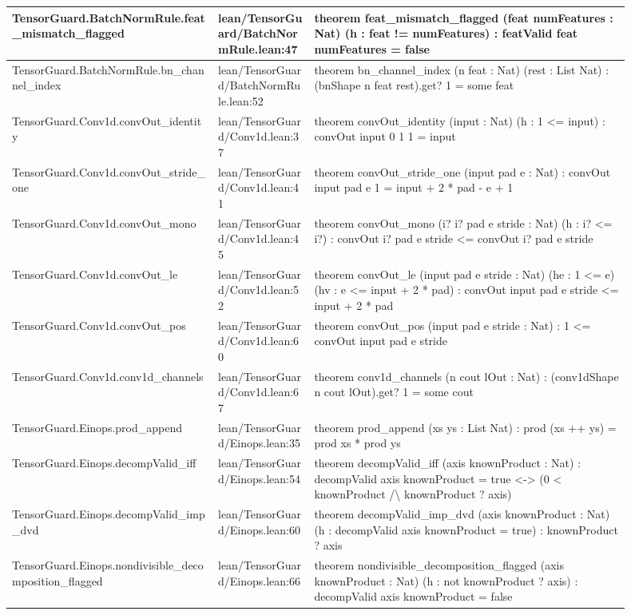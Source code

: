 \documentclass[10pt]{article}
\begin{document}
\begin{longtable}{|p{0.30\linewidth}|p{0.14\linewidth}|p{0.46\linewidth}|}
\hline
TensorGuard.BatchNormRule.feat\_mismatch\_flagged & lean/TensorGuard/BatchNormRule.lean:47 & theorem feat\_mismatch\_flagged (feat numFeatures : Nat) (h : feat != numFeatures) : featValid feat numFeatures = false \\
\hline
TensorGuard.BatchNormRule.bn\_channel\_index & lean/TensorGuard/BatchNormRule.lean:52 & theorem bn\_channel\_index (n feat : Nat) (rest : List Nat) : (bnShape n feat rest).get? 1 = some feat \\
\hline
TensorGuard.Conv1d.convOut\_identity & lean/TensorGuard/Conv1d.lean:37 & theorem convOut\_identity (input : Nat) (h : 1 <= input) : convOut input 0 1 1 = input \\
\hline
TensorGuard.Conv1d.convOut\_stride\_one & lean/TensorGuard/Conv1d.lean:41 & theorem convOut\_stride\_one (input pad e : Nat) : convOut input pad e 1 = input + 2 * pad - e + 1 \\
\hline
TensorGuard.Conv1d.convOut\_mono & lean/TensorGuard/Conv1d.lean:45 & theorem convOut\_mono (i? i? pad e stride : Nat) (h : i? <= i?) : convOut i? pad e stride <= convOut i? pad e stride \\
\hline
TensorGuard.Conv1d.convOut\_le & lean/TensorGuard/Conv1d.lean:52 & theorem convOut\_le (input pad e stride : Nat) (he : 1 <= e) (hv : e <= input + 2 * pad) : convOut input pad e stride <= input + 2 * pad \\
\hline
TensorGuard.Conv1d.convOut\_pos & lean/TensorGuard/Conv1d.lean:60 & theorem convOut\_pos (input pad e stride : Nat) : 1 <= convOut input pad e stride \\
\hline
TensorGuard.Conv1d.conv1d\_channels & lean/TensorGuard/Conv1d.lean:67 & theorem conv1d\_channels (n cout lOut : Nat) : (conv1dShape n cout lOut).get? 1 = some cout \\
\hline
TensorGuard.Einops.prod\_append & lean/TensorGuard/Einops.lean:35 & theorem prod\_append (xs ys : List Nat) : prod (xs ++ ys) = prod xs * prod ys \\
\hline
TensorGuard.Einops.decompValid\_iff & lean/TensorGuard/Einops.lean:54 & theorem decompValid\_iff (axis knownProduct : Nat) : decompValid axis knownProduct = true <-> (0 < knownProduct /\textbackslash{} knownProduct ? axis) \\
\hline
TensorGuard.Einops.decompValid\_imp\_dvd & lean/TensorGuard/Einops.lean:60 & theorem decompValid\_imp\_dvd (axis knownProduct : Nat) (h : decompValid axis knownProduct = true) : knownProduct ? axis \\
\hline
TensorGuard.Einops.nondivisible\_decomposition\_flagged & lean/TensorGuard/Einops.lean:66 & theorem nondivisible\_decomposition\_flagged (axis knownProduct : Nat) (h : not  knownProduct ? axis) : decompValid axis knownProduct = false \\

\end{longtable}
\end{document}
